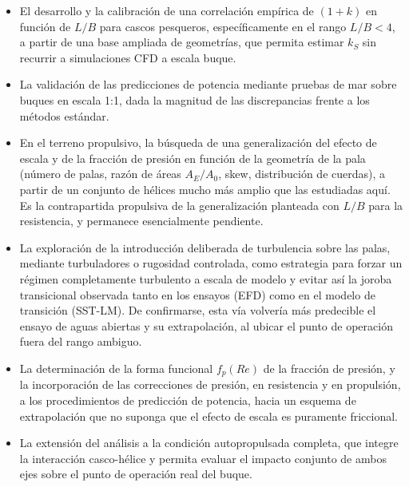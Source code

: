 \begin{itemize}
    \item El desarrollo y la calibración de una correlación empírica de $(1+k)$ en
    función de $L/B$ para cascos pesqueros, específicamente en el rango $L/B < 4$, a
    partir de una base ampliada de geometrías, que permita estimar $k_S$ sin recurrir
    a simulaciones CFD a escala buque.

    \item La validación de las predicciones de potencia mediante pruebas de mar sobre
    buques en escala 1:1, dada la magnitud de las discrepancias frente a los métodos estándar.

    \item En el terreno propulsivo, la búsqueda de una generalización del efecto de
    escala y de la fracción de presión en función de la geometría de la pala (número de
    palas, razón de áreas $A_E/A_0$, skew, distribución de cuerdas), a partir de un
    conjunto de hélices mucho más amplio que las estudiadas aquí. Es la contrapartida
    propulsiva de la generalización planteada con $L/B$ para la resistencia, y permanece
    esencialmente pendiente.

    \item La exploración de la introducción deliberada de turbulencia sobre las palas,
    mediante turbuladores o rugosidad controlada, como estrategia para forzar un régimen
    completamente turbulento a escala de modelo y evitar así la joroba transicional
    observada tanto en los ensayos (EFD) como en el modelo de transición (SST-LM). De
    confirmarse, esta vía volvería más predecible el ensayo de aguas abiertas y su extrapolación,
    al ubicar el punto de operación fuera del rango ambiguo.

    \item La determinación de la forma funcional $f_p(Re)$ de la fracción de presión, y
    la incorporación de las correcciones de presión, en resistencia y en propulsión, a
    los procedimientos de predicción de potencia, hacia un esquema de extrapolación que
    no suponga que el efecto de escala es puramente friccional.

    \item La extensión del análisis a la condición autopropulsada completa, que integre
    la interacción casco-hélice y permita evaluar el impacto conjunto de ambos ejes
    sobre el punto de operación real del buque.
\end{itemize}

